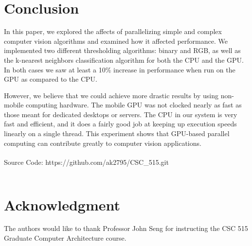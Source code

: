 \documentclass[conference]{IEEEtran}
\begin{document}




\section{Conclusion}
In this paper, we explored the affects of parallelizing simple and complex computer vision algorithms and examined how it affected performance. We implemented two different thresholding algorithms: binary and RGB, as well as the k-nearest neighbors classification algorithm for both the CPU and the GPU. In both cases we saw at least a 10\% increase in performance when run on the GPU as compared to the CPU. 

However, we believe that we could achieve more drastic results by using non-mobile computing hardware. The mobile GPU was not clocked nearly as fast as those meant for dedicated desktops or servers. The CPU in our system is very fast and efficient, and it does a fairly good job at keeping up execution speeds linearly on a single thread. This experiment shows that GPU-based parallel computing can contribute greatly to computer vision applications.
\\
\\

Source Code: https://github.com/ak2795/CSC\_515.git
\\
\\





\section*{Acknowledgment}


The authors would like to thank Professor John Seng for instructing the CSC 515 Graduate Computer Architecture course.
\end{document}

